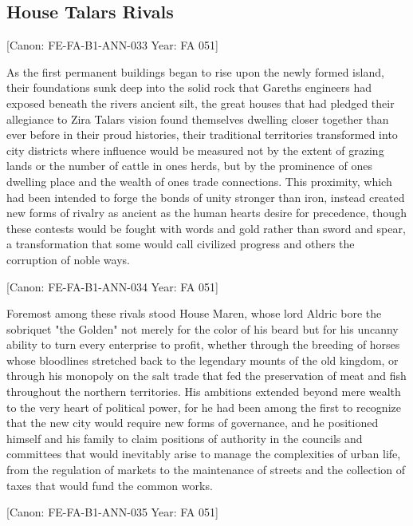 \subsection{House Talar\textquotesingle s
Rivals}\label{house-talars-rivals}

{[}Canon: FE-FA-B1-ANN-033 \textbar{} Year: FA 051{]}

As the first permanent buildings began to rise upon the newly formed
island, their foundations sunk deep into the solid rock that
Gareth\textquotesingle s engineers had exposed beneath the
river\textquotesingle s ancient silt, the great houses that had pledged
their allegiance to Zira Talar\textquotesingle s vision found themselves
dwelling closer together than ever before in their proud histories,
their traditional territories transformed into city districts where
influence would be measured not by the extent of grazing lands or the
number of cattle in one\textquotesingle s herds, but by the prominence
of one\textquotesingle s dwelling place and the wealth of
one\textquotesingle s trade connections. This proximity, which had been
intended to forge the bonds of unity stronger than iron, instead created
new forms of rivalry as ancient as the human heart\textquotesingle s
desire for precedence, though these contests would be fought with words
and gold rather than sword and spear, a transformation that some would
call civilized progress and others the corruption of noble ways.

{[}Canon: FE-FA-B1-ANN-034 \textbar{} Year: FA 051{]}

Foremost among these rivals stood House Maren, whose lord Aldric bore
the sobriquet "the Golden" not merely for the color of his beard but for
his uncanny ability to turn every enterprise to profit, whether through
the breeding of horses whose bloodlines stretched back to the legendary
mounts of the old kingdom, or through his monopoly on the salt trade
that fed the preservation of meat and fish throughout the northern
territories. His ambitions extended beyond mere wealth to the very heart
of political power, for he had been among the first to recognize that
the new city would require new forms of governance, and he positioned
himself and his family to claim positions of authority in the councils
and committees that would inevitably arise to manage the complexities of
urban life, from the regulation of markets to the maintenance of streets
and the collection of taxes that would fund the common works.

{[}Canon: FE-FA-B1-ANN-035 \textbar{} Year: FA 051{]}

